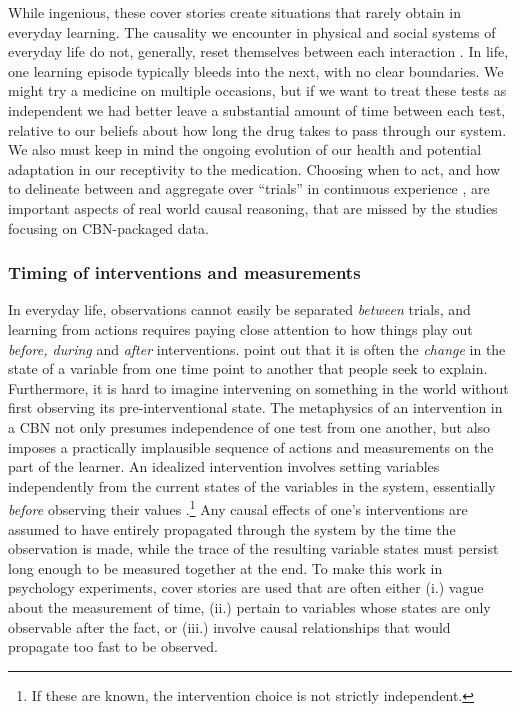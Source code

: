 \documentclass{cambridge7A}%
\newcommand{\ttodo}[2][]{\vspace{0.1cm} \hfil \todo[caption={\textbf{TG}}, size=\footnotesize, color = orange, inline, #1]{#2}}
\begin{document}
While ingenious, these cover stories create situations that rarely obtain in everyday learning.  The causality we encounter in physical and social systems of everyday life do not, generally, reset themselves between each interaction \citep{greville2007influence,rottman2016searching}.  In life, one learning episode typically bleeds into the next, with no clear boundaries.  We might try a medicine on multiple occasions, but if we want to treat these tests as independent we had better leave a substantial amount of time between each test, relative to our beliefs about how long the drug takes to pass through our system.  We also must keep in mind the ongoing evolution of our health and potential adaptation in our receptivity to the medication. Choosing when to act, and how to delineate between and aggregate over ``trials'' in continuous experience \citep[cf][]{tulving1972episodic,gallistel2000time}, are important aspects of real world causal reasoning, that are missed by the studies focusing on CBN-packaged data.


\subsubsection{Timing of interventions and measurements}

In everyday life, observations cannot easily be separated \emph{between} trials, and learning from actions requires paying close attention to how things play out \emph{before, during} and \emph{after} interventions.   \cite{rottman2012causal} point out that it is often the \emph{change} in the state of a variable from one time point to another that people seek to explain.  Furthermore, it is hard to imagine intervening on something in the world without first observing its pre-interventional state.  The metaphysics of an intervention in a CBN not only presumes independence of one test from one another, but also imposes a practically implausible sequence of actions and measurements on the part of the learner.  An idealized intervention involves setting variables independently from the current states of the variables in the system, essentially \emph{before} observing their values \citep{pearl2000causality}.\footnote{If these are known, the intervention choice is not strictly independent.} \ttodo{i would remove the footnote}  Any causal effects of one's interventions are assumed to have entirely propagated through the system by the time the observation is made, while the trace of the resulting variable states must persist long enough to be measured together at the end.  
To make this work in psychology experiments, cover stories are used that are often either (i.) vague about the measurement of time, (ii.) pertain to variables whose states are only observable after the fact, or (iii.) involve causal relationships that would propagate too fast to be observed.  
\end{document}

